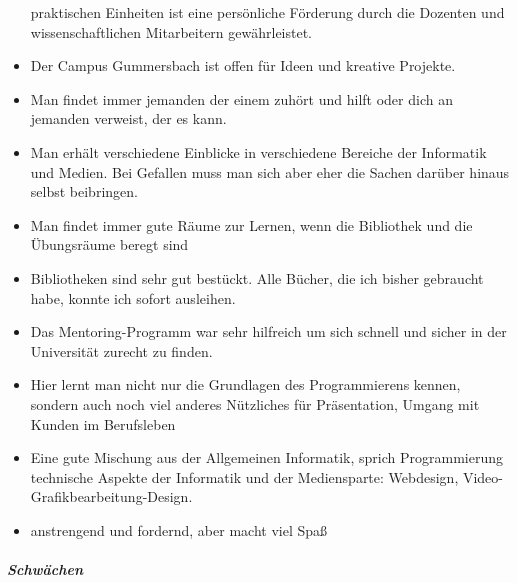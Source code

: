 \begin{itemize}
  praktischen Einheiten ist eine persönliche Förderung durch die
  Dozenten und wissenschaftlichen Mitarbeitern gewährleistet.
\item
  Der Campus Gummersbach ist offen für Ideen und kreative Projekte.
\item
  Man findet immer jemanden der einem zuhört und hilft oder dich an
  jemanden verweist, der es kann.
\item
  Man erhält verschiedene Einblicke in verschiedene Bereiche der
  Informatik und Medien. Bei Gefallen muss man sich aber eher die Sachen
  darüber hinaus selbst beibringen.
\item
  Man findet immer gute Räume zur Lernen, wenn die Bibliothek und die
  Übungsräume beregt sind
\item
  Bibliotheken sind sehr gut bestückt. Alle Bücher, die ich bisher
  gebraucht habe, konnte ich sofort ausleihen.
\item
  Das Mentoring-Programm war sehr hilfreich um sich schnell und sicher
  in der Universität zurecht zu finden.
\item
  Hier lernt man nicht nur die Grundlagen des Programmierens kennen,
  sondern auch noch viel anderes Nützliches für Präsentation, Umgang mit
  Kunden im Berufsleben
\item
  Eine gute Mischung aus der Allgemeinen Informatik, sprich
  Programmierung technische Aspekte der Informatik und der Mediensparte:
  Webdesign, Video-Grafikbearbeitung-Design.
\item
  anstrengend und fordernd, aber macht viel Spaß
\end{itemize}

\subparagraph{Schwächen}\label{schwuxe4chen}

